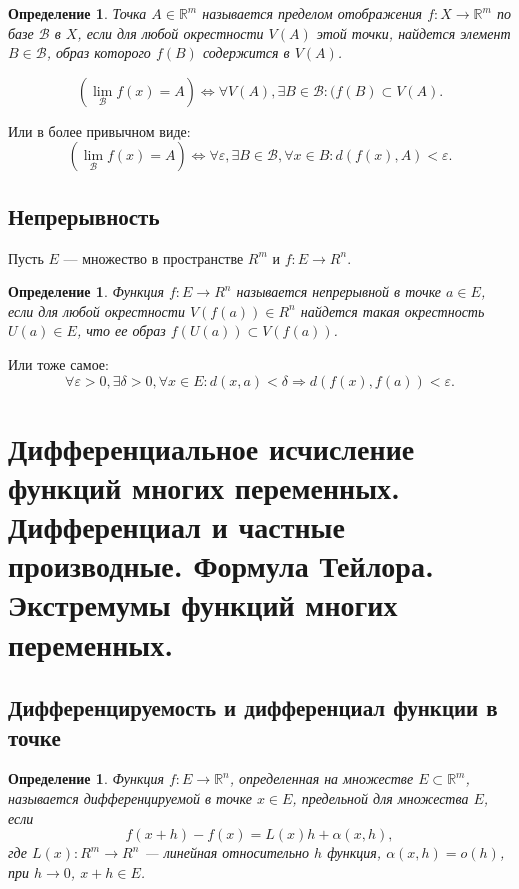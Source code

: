 \documentclass[12pt]{report}
\theoremstyle{plain}
\newtheorem{definition}[theorem]{Определение}
\newcommand{\R}{\mathbb R}
\newcommand{\B}{\mathcal B}
\begin{document}
\begin{definition}
Точка $A \in \R^m$ называется пределом отображения $f: X \rightarrow \R^m$
по базе $\B$ в $X$, если для любой окрестности $V(A)$ этой точки, найдется элемент
$B \in \B$, образ которого $f(B)$ содержится в $V(A)$.
\end{definition}

$$
(\lim\limits_{\B} f(x) = A) \Leftrightarrow \forall V(A), \exists B \in \B: (f(B) \subset V(A).
$$

Или в более привычном виде:
$$
(\lim\limits_{\B} f(x) = A) \Leftrightarrow \forall \varepsilon, \exists B \in \B, \forall x \in B: d(f(x), A) < \varepsilon.
$$

\subsection{Непрерывность}
Пусть $E$ --- множество в пространстве $R^m$ и $f: E \rightarrow R^n$.

\begin{definition}
Функция $f: E \rightarrow R^n$ называется непрерывной в точке $a \in E$,
если для любой окрестности $V(f(a)) \in R^n$ найдется такая окрестность
$U(a) \in E$, что ее образ $f(U(a)) \subset V(f(a))$.
\end{definition}

Или тоже самое:
$$
\forall \varepsilon > 0, \exists \delta > 0, \forall x \in E: d(x, a) < \delta \Rightarrow d(f(x), f(a)) < \varepsilon.
$$


\section
{
  Дифференциальное исчисление функций многих переменных.
  Дифференциал и частные производные. Формула Тейлора.
  Экстремумы функций многих переменных.
}

\subsection{Дифференцируемость и дифференциал функции в точке}
\begin{definition}
Функция $f: E \rightarrow \R^n$, определенная на множестве $E \subset \R^m$,
называется дифференцируемой в точке $x \in E$, предельной для множества $E$,
если
$$
f(x + h) - f(x) = L(x)h + \alpha(x, h),
$$
где $L(x): R^m \rightarrow R^n$ --- линейная относительно $h$ функция,
$\alpha(x, h) = o(h)$, при $h\rightarrow 0$, $x + h \in E$.
\end{definition}
\end{document}
